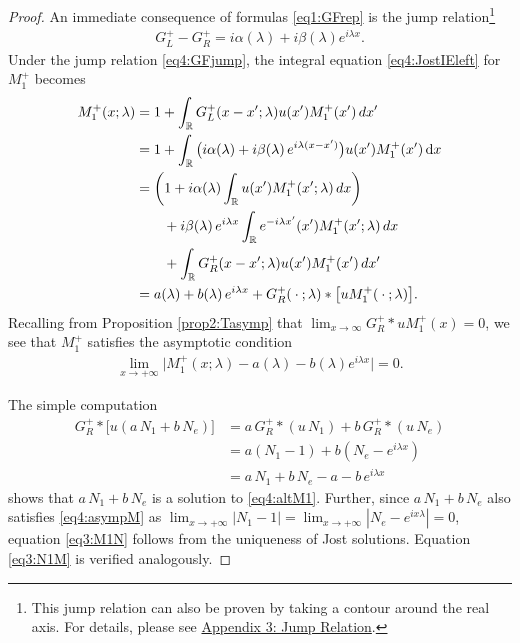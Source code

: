 \documentclass[../dissertation.tex]{subfiles}
\begin{document}
\begin{proof}
	An immediate consequence of formulas \eqref{eq1:GFrep} is the jump 
	relation\footnote{This jump relation can also be proven by taking a contour 
	around the real axis. For details, please see 
	\hyperref[app:JumpRelation]{Appendix 3: Jump Relation}.}
	\begin{align}\label{eq4:GFjump}
		G_L^+ - G_R^+ = i \alpha(\lambda) + i \beta(\lambda) e^{i \lambda x}.
	\end{align}
	Under the jump relation \eqref{eq4:GFjump}, the integral equation 
	\eqref{eq4:JostIEleft} for $M_1^+$ becomes
	\begin{align}\label{eq4:altM1}
		M_1^+(x; \lambda) 
			&= 1 + \int_{\mathbb R} G_L^+(x-x'; \lambda) u(x') M_1^+(x')\,dx' \\
			&= 1 
				+ \int_{\mathbb R} 
					\big(
						i \alpha(\lambda) 
						+ i \beta(\lambda) \, e^{i \lambda (x-x')}
					\big)
					u(x') M_1^+(x') 
				\, \mathrm{d}x \nonumber \\
			&= \left(
					1 
					+ i \alpha(\lambda) 
						\int_{\mathbb R} u(x')M_1^+(x'; \lambda)\,dx 
				\right)  
				\nonumber \\
			&\qquad+ i \beta(\lambda) \, e^{i\lambda x} 
					\int_{\mathbb R} e^{-i\lambda x'} (x')M_1^+(x'; \lambda)\,dx 
				\nonumber \\
			&\qquad+ \int_{\mathbb R} G_R^+(x-x'; \lambda) u(x') M_1^+(x')\,dx'
				\nonumber \\
			&= a(\lambda) + b(\lambda) \,e^{i\lambda x} 
				+ G_R^+(\kern 0.5ex \cdot \kern 0.5ex; \lambda) * \big[uM_1^+(\kern 0.5ex \cdot \kern 0.5ex; \lambda)\big].
				\nonumber
	\end{align}
	Recalling from Proposition \ref{prop2:Tasymp} that 
	$\lim_{x\to\infty} G_R^+*uM_1^+(x) = 0$, we see that $M_1^+$ satisfies the 
	asymptotic condition
	\begin{align} \label{eq4:asympM}
		\lim_{x\to+\infty} 
			\big|M_1^+(x; \lambda) - a(\lambda) - b(\lambda)e^{i\lambda x}\big|
			= 0.
	\end{align}

	The simple computation
	\begin{align*}
		G_R^+ * \big[ u(a\,N_1 + b\, N_e)\big]
			&= a \, G_R^+ *(u\, N_1) + b \, G_R^+ *(u\, N_e) \\
			&= a(N_1 - 1) + b(N_e - e^{i\lambda x}) \\
			&= a\, N_1 + b \, N_e - a - b\, e^{i\lambda x}
	\end{align*}
	shows that $a\, N_1 + b \, N_e$ is a solution to \eqref{eq4:altM1}. Further, 
	since $a\, N_1 + b \, N_e$ also satisfies \eqref{eq4:asympM} as
	$\lim_{x\to+\infty} |N_1-1| = \lim_{x\to+\infty} |N_e - e^{ix\lambda}| = 0$,
	equation \eqref{eq3:M1N} follows from the uniqueness of Jost solutions. 
	Equation \eqref{eq3:N1M} is verified analogously.
\end{proof}
\end{document}
